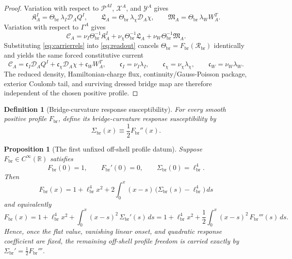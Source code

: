 \documentclass[11pt]{article}
\newcommand{\SpatialD}{\mathcal D}
\newcommand{\ConstCurrent}{\mathcal C}
\newcommand{\ConstGamma}{\Gamma}
\newcommand{\CurvQMult}{\mathscr P}
\newcommand{\CurvChiMult}{\mathscr X}
\newcommand{\CurvTransMult}{\mathscr Y}
\newcommand{\CurvSeed}{\Theta_{\mathrm{br}}}
\newcommand{\CurvScale}{\ell_{\mathrm{br}}}
\newcommand{\CurvProfile}{F_{\mathrm{br}}}
\newcommand{\CurvOneI}{\mathfrak K}
\newcommand{\CurvOneChi}{\mathfrak L}
\newcommand{\CurvOneW}{\mathfrak M}
\newcommand{\BridgeCurv}{\mathcal R_{\mathrm{br}}}
\newcommand{\RespSus}{\Sigma_{\mathrm{br}}}
\newtheorem{definition}{Definition}
\newtheorem{proposition}{Proposition}
\begin{document}
\begin{proof}
Variation with respect to \(\CurvQMult^{AI}\), \(\CurvChiMult^A\), and \(\CurvTransMult^A\) gives
\begin{equation}
\CurvOneI_A^I=\CurvSeed\,\lambda_I\SpatialD_AQ^I,
\qquad
\CurvOneChi_A=\CurvSeed\,\lambda_\chi\SpatialD_A\chi,
\qquad
\CurvOneW_A=\CurvSeed\,\lambda_WW_A^T.
\label{eq:carrierrels}
\end{equation}
Variation with respect to \(\ConstGamma^A\) gives
\begin{equation}
\ConstCurrent_A
=
\nu_I\CurvSeed^{-1}\CurvOneI_A^I
+\nu_\chi\CurvSeed^{-1}\CurvOneChi_A
+\nu_W\CurvSeed^{-1}\CurvOneW_A.
\label{eq:readout}
\end{equation}
Substituting \eqref{eq:carrierrels} into \eqref{eq:readout} cancels \(\CurvSeed=\CurvProfile(\BridgeCurv)\) identically and yields the same forced constitutive current
\begin{equation}
\ConstCurrent_A
=
\mathfrak c_I\SpatialD_AQ^I
+\mathfrak c_\chi\SpatialD_A\chi
+\mathfrak c_WW_A^T,
\qquad
\mathfrak c_I=\nu_I\lambda_I,
\qquad
\mathfrak c_\chi=\nu_\chi\lambda_\chi,
\qquad
\mathfrak c_W=\nu_W\lambda_W.
\label{eq:forcedcurrent}
\end{equation}
The reduced density, Hamiltonian-charge flux, continuity/Gauss-Poisson package, exterior Coulomb tail, and surviving dressed bridge map are therefore independent of the chosen positive profile.
\end{proof}

\begin{definition}[Bridge-curvature response susceptibility]
\label{def:susceptibility}
For every smooth positive profile \(\CurvProfile\), define its \emph{bridge-curvature response susceptibility} by
\begin{equation}
\RespSus(x)\equiv \frac12 \CurvProfile''(x).
\label{eq:susceptibility}
\end{equation}
\end{definition}

\begin{proposition}[The first unfixed off-shell profile datum]
\label{prop:firstdatum}
Suppose \(\CurvProfile\in C^\infty(\mathbb R)\) satisfies
\begin{equation}
\CurvProfile(0)=1,
\qquad
\CurvProfile'(0)=0,
\qquad
\RespSus(0)=\CurvScale^4.
\label{eq:jetdata}
\end{equation}
Then
\begin{equation}
\CurvProfile(x)
=
1+\CurvScale^4x^2
+2\int_0^x (x-s)\,\bigl(\RespSus(s)-\CurvScale^4\bigr)\,ds
\label{eq:integralrep_sigma}
\end{equation}
and equivalently
\begin{equation}
\CurvProfile(x)
=
1+\CurvScale^4x^2
+\int_0^x (x-s)^2\,\RespSus'(s)\,ds
=
1+\CurvScale^4x^2
+\frac12\int_0^x (x-s)^2\,\CurvProfile'''(s)\,ds.
\label{eq:integralrep_f3}
\end{equation}
Hence, once the flat value, vanishing linear onset, and quadratic response coefficient are fixed, the remaining off-shell profile freedom is carried exactly by \(\RespSus'=\frac12\CurvProfile'''\).
\end{proposition}
\end{document}

